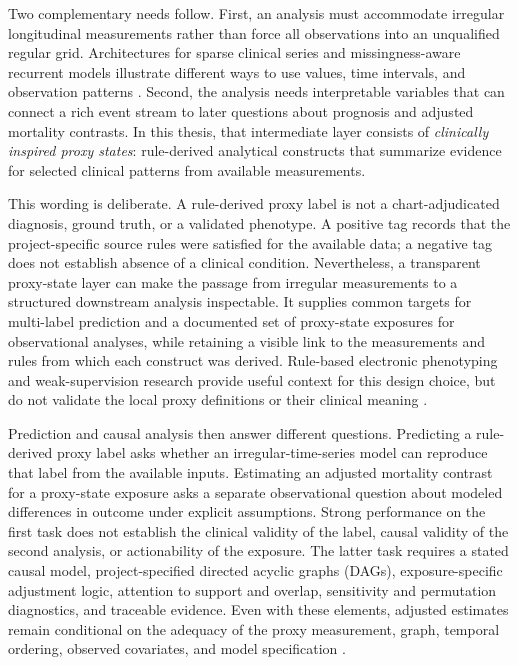 Two complementary needs follow.  First, an analysis must accommodate irregular longitudinal measurements rather than force all observations into an unqualified regular grid.  Architectures for sparse clinical series and missingness-aware recurrent models illustrate different ways to use values, time intervals, and observation patterns \cite{tipirneni2022strats,che2018grud}.  Second, the analysis needs interpretable variables that can connect a rich event stream to later questions about prognosis and adjusted mortality contrasts.  In this thesis, that intermediate layer consists of \emph{clinically inspired proxy states}: rule-derived analytical constructs that summarize evidence for selected clinical patterns from available measurements.

This wording is deliberate.  A rule-derived proxy label is not a chart-adjudicated diagnosis, ground truth, or a validated phenotype.  A positive tag records that the project-specific source rules were satisfied for the available data; a negative tag does not establish absence of a clinical condition.  Nevertheless, a transparent proxy-state layer can make the passage from irregular measurements to a structured downstream analysis inspectable.  It supplies common targets for multi-label prediction and a documented set of proxy-state exposures for observational analyses, while retaining a visible link to the measurements and rules from which each construct was derived.  Rule-based electronic phenotyping and weak-supervision research provide useful context for this design choice, but do not validate the local proxy definitions or their clinical meaning \cite{banda_2018_electronic_phenotyping,ratner_et_al_2020_snorkel}.

Prediction and causal analysis then answer different questions.  Predicting a rule-derived proxy label asks whether an irregular-time-series model can reproduce that label from the available inputs.  Estimating an adjusted mortality contrast for a proxy-state exposure asks a separate observational question about modeled differences in outcome under explicit assumptions.  Strong performance on the first task does not establish the clinical validity of the label, causal validity of the second analysis, or actionability of the exposure.  The latter task requires a stated causal model, project-specified directed acyclic graphs (DAGs), exposure-specific adjustment logic, attention to support and overlap, sensitivity and permutation diagnostics, and traceable evidence.  Even with these elements, adjusted estimates remain conditional on the adequacy of the proxy measurement, graph, temporal ordering, observed covariates, and model specification \cite{pearl_1995_causal_diagrams,hernan_robins_2016_target_trial,hernan_taubman_2008_well_defined_interventions}.

